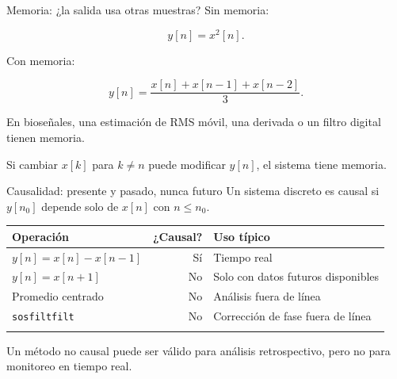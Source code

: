 \documentclass[
  ignorenonframetext,
  aspectratio=169,
  spanish,
  professionalfonts]{beamer}
\newcounter{none} %
\begin{document}
\begin{frame}{Memoria: ¿la salida usa otras muestras?}
\protect{}\label{memoria-la-salida-usa-otras-muestras}
Sin memoria:

\[
y[n]=x^2[n].
\]

Con memoria:

\[
y[n]=\frac{x[n]+x[n-1]+x[n-2]}{3}.
\]

En bioseñales, una estimación de RMS móvil, una derivada o un filtro
digital tienen memoria.

\begin{tcolorbox}[enhanced jigsaw, arc=.35mm, bottomrule=.15mm, bottomtitle=1mm, breakable, colback=white, colbacktitle=quarto-callout-note-color!10!white, colframe=quarto-callout-note-color-frame, coltitle=black, left=2mm, leftrule=.75mm, opacityback=0, opacitybacktitle=0.6, rightrule=.15mm, title={Prueba rápida}, titlerule=0mm, toprule=.15mm, toptitle=1mm]

Si cambiar \(x[k]\) para \(k\neq n\) puede modificar \(y[n]\), el
sistema tiene memoria.

\end{tcolorbox}
\end{frame}

\begin{frame}[fragile]{Causalidad: presente y pasado, nunca futuro}
\protect{}\label{causalidad-presente-y-pasado-nunca-futuro}
Un sistema discreto es causal si \(y[n_0]\) depende solo de \(x[n]\) con
\(n\le n_0\).

{\def\LTcaptype{none} %
\begin{longtable}[]{@{}lrl@{}}
\toprule\noalign{}
Operación & ¿Causal? & Uso típico \\
\midrule\noalign{}
\endhead
\(y[n]=x[n]-x[n-1]\) & Sí & Tiempo real \\
\(y[n]=x[n+1]\) & No & Solo con datos futuros disponibles \\
Promedio centrado & No & Análisis fuera de línea \\
\texttt{sosfiltfilt} & No & Corrección de fase fuera de línea \\
\bottomrule\noalign{}
\end{longtable}
}

\begin{tcolorbox}[enhanced jigsaw, arc=.35mm, bottomrule=.15mm, bottomtitle=1mm, breakable, colback=white, colbacktitle=quarto-callout-warning-color!10!white, colframe=quarto-callout-warning-color-frame, coltitle=black, left=2mm, leftrule=.75mm, opacityback=0, opacitybacktitle=0.6, rightrule=.15mm, title={Implicación}, titlerule=0mm, toprule=.15mm, toptitle=1mm]

Un método no causal puede ser válido para análisis retrospectivo, pero
no para monitoreo en tiempo real.

\end{tcolorbox}
\end{frame}
\end{document}
